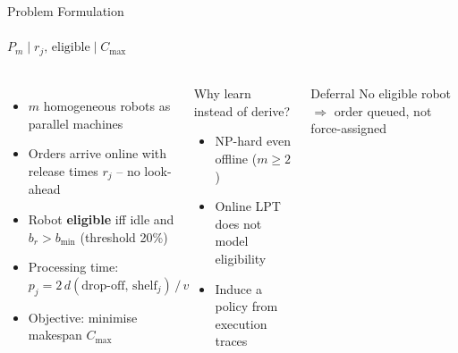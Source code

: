 \documentclass[aspectratio=169]{beamer}
\begin{document}
\begin{frame}{Problem Formulation}
  \framesubtitle{$P_m \mid r_j,\, \mathrm{eligible} \mid C_{\max}$}
  \begin{columns}
      \begin{itemize}
        \item $m$ homogeneous robots as parallel machines
        \item Orders arrive online with release times $r_j$ -- no look-ahead
        \item Robot \textbf{eligible} iff idle and $b_r > b_{\min}$ (threshold 20\%)
        \item Processing time: $p_j = 2\,d(\text{drop-off},\, \text{shelf}_j)\,/\,v$
        \item Objective: minimise makespan $C_{\max}$
      \end{itemize}
      \begin{block}{Why learn instead of derive?}
        \begin{itemize}
          \item NP-hard even offline ($m \geq 2$)
          \item Online LPT does not model eligibility
          \item \alert{Induce a policy from execution traces}
        \end{itemize}
      \end{block}
      \begin{alertblock}{Deferral}
        No eligible robot $\Rightarrow$ order queued, not force-assigned
      \end{alertblock}
  \end{columns}
\end{frame}
\end{document}
